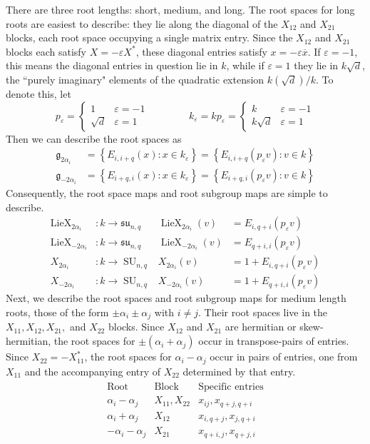 \documentclass[12pt]{article}
\theoremstyle{definition}
\numberwithin{theorem}{subsection}
\newcommand{\eps}{\varepsilon}
\newcommand{\lb}{\left\{}
\newcommand{\rb}{\right\}}
\newcommand{\ov}{\overline}
\newcommand{\frakg}{\mathfrak{g}}
\newcommand{\fraksu}{\mathfrak{su}}
\DeclareMathOperator{\SU}{SU}
\DeclareMathOperator{\LieX}{LieX}
\begin{document}
There are three root lengths: short, medium, and long. The root spaces for long roots are easiest to describe: they lie along the diagonal of the $X_{12}$ and $X_{21}$ blocks, each root space occupying a single matrix entry. Since the $X_{12}$ and $X_{21}$ blocks each satisfy $X = - \eps X^*$, these diagonal entries satisfy $x = - \eps \ov x$. If $\eps = -1$, this means the diagonal entries in question lie in $k$, while if $\eps = 1$ they lie in $k \sqrt{d}$, the ``purely imaginary" elements of the quadratic extension $k(\sqrt{d})/k$. To denote this, let
\[
	p_\eps =
	\begin{cases}
		1 & \eps = -1 \\
		\sqrt{d} & \eps = 1
	\end{cases}
	\qquad \qquad
	k_\eps = k p_\eps = 
	\begin{cases}
		k & \eps = -1 \\
		k \sqrt{d} & \eps = 1
	\end{cases} 
\]
Then we can describe the root spaces as
\begin{align*}
	\frakg_{2\alpha_i} &= \lb E_{i,i+q}(x) : x \in k_\eps \rb = \lb E_{i,i+q}(p_\eps v) : v \in k \rb \\
	\frakg_{-2\alpha_i} &= \lb E_{i+q, i}(x) : x \in k_\eps \rb = \lb E_{i+q,i}(p_\eps v) : v \in k \rb
\end{align*}
Consequently, the root space maps and root subgroup maps are simple to describe.
\begin{align*}
	\LieX_{2\alpha_i}&:k \to \fraksu_{n,q} & \LieX_{2\alpha_i}(v) &= E_{i,q+i}(p_\eps v) \\
	\LieX_{-2\alpha_i}&:k \to \fraksu_{n,q} & \LieX_{-2\alpha_i}(v) &= E_{q+i, i}(p_\eps v) \\
	X_{2\alpha_i}&:k \to \SU_{n,q} & X_{2\alpha_i}(v) &= 1 + E_{i,q+i}(p_\eps v) \\
	X_{-2\alpha_i}&:k \to \SU_{n,q} & X_{-2\alpha_i}(v) &= 1 + E_{q+i,i}(p_\eps v)
\end{align*}
Next, we describe the root spaces and root subgroup maps for medium length roots, those of the form $\pm \alpha_i \pm \alpha_j$ with $i \neq j$. Their root spaces live in the $X_{11}, X_{12}, X_{21},$ and $X_{22}$ blocks. Since $X_{12}$ and $X_{21}$ are hermitian or skew-hermitian, the root spaces for $\pm (\alpha_i + \alpha_j)$ occur in transpose-pairs of entries. Since $X_{22} = - X_{11}^*$, the root spaces for $\alpha_i - \alpha_j$ occur in pairs of entries, one from $X_{11}$ and the accompanying entry of $X_{22}$ determined by that entry.
\begin{align*}
	\begin{array}{c|c|c}
		\text{Root} & \text{Block} &  \text{Specific entries} \\
		\hline
		\alpha_i - \alpha_j & X_{11}, X_{22} & x_{ij}, x_{q+j, q+i} \\
		\alpha_i + \alpha_j & X_{12} & x_{i, q+j}, x_{j, q+i} \\
		-\alpha_i - \alpha_j & X_{21} & x_{q+i, j}, x_{q+j, i}
	\end{array}
\end{align*}
\end{document}
